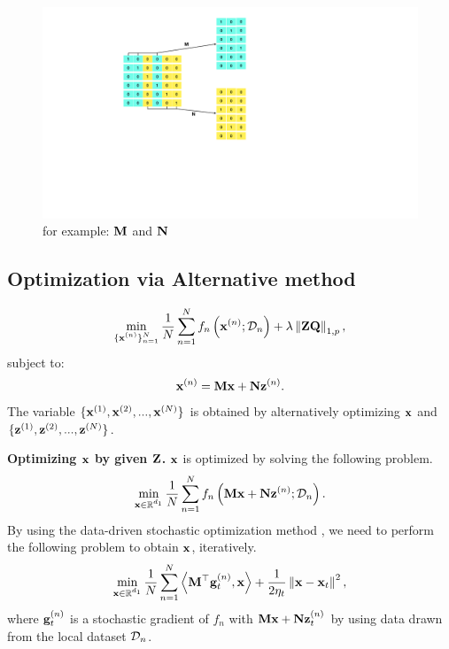 \documentclass[journal]{IEEEtran}
\begin{document}
\begin{figure}[!t]
\setlength{\abovecaptionskip}{0pt}
\setlength{\belowcaptionskip}{0pt}
\centering 
\includegraphics[width=0.97\columnwidth]{figs/figs_MNmatrix}
\caption{for example: ${\bf M}$ and ${\bf N}$ }
\label{figure_xxx}
\end{figure}


\subsection{Optimization via Alternative method}

\begin{align}
\min_{\substack{\{{\bf x}^{(n)}\}_{n=1}^N}} \frac{1}{N}\sum_{n=1}^N f_n\left( {\bf x}^{(n)}; \mathcal{D}_n \right) + \lambda \left\lVert{\bf Z}{\bf Q}\right\rVert_{1,p},
\end{align} subject to:
\begin{align}
{\bf x}^{(n)} = {\bf M}{\bf x} + {\bf N} {\bf z}^{(n)}.
\end{align}
The variable $\{{\bf x}^{(1)}, {\bf x}^{(2)}, ..., {\bf x}^{(N)}\}$ is obtained by alternatively optimizing ${\bf x}$ and $\{{\bf z}^{(1)}, {\bf z}^{(2)}, ..., {\bf z}^{(N)}\}$.

\textbf{Optimizing ${\bf x}$ by given ${\bf Z}$.} ${\bf x}$ is optimized by solving the following problem.
\begin{align}
\min_{\substack{{\bf x}\in\mathbb{R}^{d_1}}} \frac{1}{N}\sum_{n=1}^N f_n\left( {\bf M}{\bf x} + {\bf N} {\bf z}^{(n)}; \mathcal{D}_n \right).
\end{align} By using the data-driven stochastic optimization method \cite{dd}, we need to perform the following problem to obtain ${\bf x}$, iteratively.
\begin{align}
\nonumber
\min_{\substack{{\bf x}\in\mathbb{R}^{d_1}}} \frac{1}{N}\sum_{n=1}^N \left\langle{\bf M}^\top{\bf g}_t^{(n)}, {\bf x} \right\rangle + \frac{1}{2\eta_t}\left\lVert{\bf x} - {\bf x}_t\right\rVert^2,
\end{align} where ${\bf g}_t^{(n)}$ is a stochastic gradient of $f_n$ with ${\bf M}{\bf x} + {\bf N} {\bf z}_t^{(n)}$ by using data drawn from the local dataset $\mathcal{D}_n$.
\end{document}
